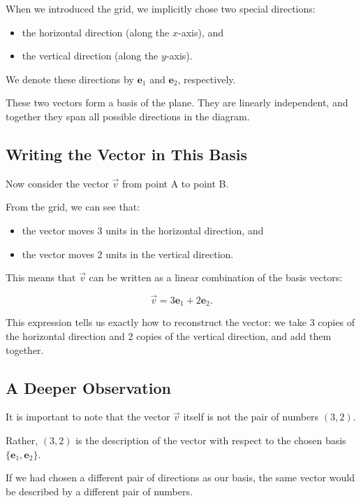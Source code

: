 \documentclass[11pt,openany]{book}
\theoremstyle{definition}
\begin{document}
When we introduced the grid, we implicitly chose two special directions:

\begin{itemize}
  \item the horizontal direction (along the $x$-axis), and
  \item the vertical direction (along the $y$-axis).
\end{itemize}

We denote these directions by $\mathbf{e}_1$ and $\mathbf{e}_2$, respectively.

These two vectors form a basis of the plane.
They are linearly independent, and together they span all possible directions in the diagram.

\medskip

\subsection{Writing the Vector in This Basis}

Now consider the vector $\vec{v}$ from point A to point B.

From the grid, we can see that:

\begin{itemize}
  \item the vector moves 3 units in the horizontal direction, and
  \item the vector moves 2 units in the vertical direction.
\end{itemize}

This means that $\vec{v}$ can be written as a linear combination of the basis vectors:

\[
\vec{v} = 3\mathbf{e}_1 + 2\mathbf{e}_2.
\]

This expression tells us exactly how to reconstruct the vector:
we take 3 copies of the horizontal direction and 2 copies of the vertical direction, and add them together.

\medskip

\subsection{A Deeper Observation}

It is important to note that the vector $\vec{v}$ itself is not the pair of numbers $(3,2)$.

Rather, $(3,2)$ is the description of the vector with respect to the chosen basis $\{\mathbf{e}_1, \mathbf{e}_2\}$.

If we had chosen a different pair of directions as our basis, the same vector would be described by a different pair of numbers.
\end{document}
